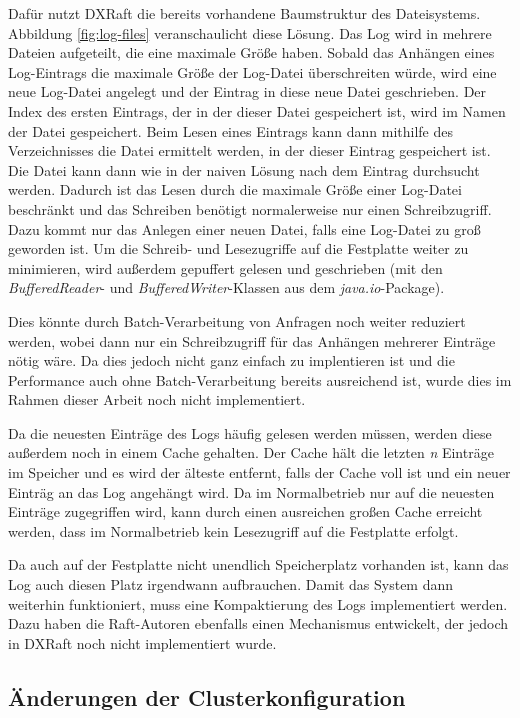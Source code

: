 Dafür nutzt DXRaft die bereits vorhandene Baumstruktur des Dateisystems. Abbildung \ref{fig:log-files} veranschaulicht diese Lösung. Das Log wird in mehrere Dateien aufgeteilt, die eine maximale Größe haben. Sobald das Anhängen eines Log-Eintrags die maximale Größe der Log-Datei überschreiten würde, wird eine neue Log-Datei angelegt und der Eintrag in diese neue Datei geschrieben. Der Index des ersten Eintrags, der in der dieser Datei gespeichert ist, wird im Namen der Datei gespeichert. Beim Lesen eines Eintrags kann dann mithilfe des Verzeichnisses die Datei ermittelt werden, in der dieser Eintrag gespeichert ist. Die Datei kann dann wie in der naiven Lösung nach dem Eintrag durchsucht werden. Dadurch ist das Lesen durch die maximale Größe einer Log-Datei beschränkt und das Schreiben benötigt normalerweise nur einen Schreibzugriff. Dazu kommt nur das Anlegen einer neuen Datei, falls eine Log-Datei zu groß geworden ist. Um die Schreib- und Lesezugriffe auf die Festplatte weiter zu minimieren, wird außerdem gepuffert gelesen und geschrieben (mit den \textit{BufferedReader}- und \textit{BufferedWriter}-Klassen aus dem \textit{java.io}-Package).
		
Dies könnte durch Batch-Verarbeitung von Anfragen noch weiter reduziert werden, wobei dann nur ein Schreibzugriff für das Anhängen mehrerer Einträge nötig wäre. Da dies jedoch nicht ganz einfach zu implentieren ist und die Performance auch ohne Batch-Verarbeitung bereits ausreichend ist, wurde dies im Rahmen dieser Arbeit noch nicht implementiert.

Da die neuesten Einträge des Logs häufig gelesen werden müssen, werden diese außerdem noch in einem Cache gehalten. Der Cache hält die letzten \textit{n} Einträge im Speicher und es wird der älteste entfernt, falls der Cache voll ist und ein neuer Einträg an das Log angehängt wird. Da im Normalbetrieb nur auf die neuesten Einträge zugegriffen wird, kann durch einen ausreichen großen Cache erreicht werden, dass im Normalbetrieb kein Lesezugriff auf die Festplatte erfolgt.

Da auch auf der Festplatte nicht unendlich Speicherplatz vorhanden ist, kann das Log auch diesen Platz irgendwann aufbrauchen. Damit das System dann weiterhin funktioniert, muss eine Kompaktierung des Logs implementiert werden. Dazu haben die Raft-Autoren ebenfalls einen Mechanismus entwickelt, der jedoch in DXRaft noch nicht implementiert wurde.

\subsection{Änderungen der Clusterkonfiguration}
\label{config-change}

